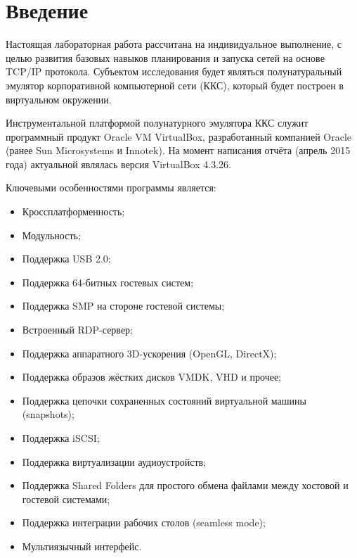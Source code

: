 \newpage
\section*{Введение}

Настоящая лабораторная работа рассчитана на индивидуальное выполнение, с целью развития базовых навыков планирования и запуска сетей на основе TCP/IP протокола. Субъектом исследования будет являться полунатуральный эмулятор корпоративной компьютерной сети (ККС), который будет построен в виртуальном окружении.

Инструментальной платформой полунатурного эмулятора ККС служит программный продукт Oracle VM VirtualBox, разработанный компанией Oracle (ранее Sun Microsystems и Innotek). На момент написания отчёта (апрель 2015 года) актуальной являлась версия VirtualBox 4.3.26.

Ключевыми особенностями программы является:
\begin{itemize}
\item Кроссплатформенность;
\item Модульность;
\item Поддержка USB 2.0;
\item Поддержка 64-битных гостевых систем;
\item Поддержка SMP на стороне гостевой системы;
\item Встроенный RDP-сервер;
\item Поддержка аппаратного 3D-ускорения (OpenGL, DirectX);
\item Поддержка образов жёстких дисков VMDK, VHD и прочее;
\item Поддержка цепочки сохраненных состояний виртуальной машины (snapshots);
\item Поддержка iSCSI;
\item Поддержка виртуализации аудиоустройств;
\item Поддержка Shared Folders для простого обмена файлами между хостовой и гостевой системами;
\item Поддержка интеграции рабочих столов (seamless mode);
\item Мультиязычный интерфейс.
\end{itemize}

